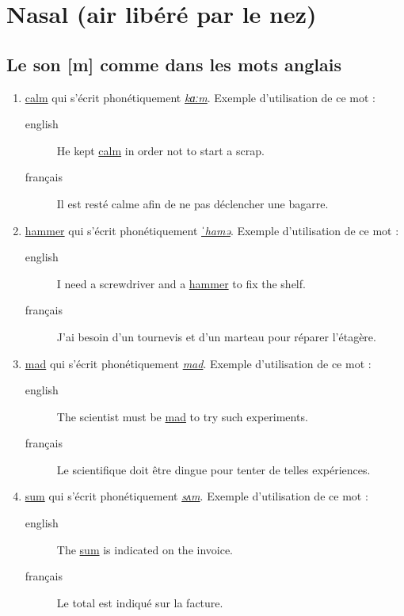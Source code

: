 \section{Nasal (air libéré par le nez)}
\label{sec:org63d4d3c}
\subsection{Le son [m] comme dans les mots anglais}
\label{sec:org6dbd0b1}
\begin{enumerate}
\item \href{http://www.wordreference.com/enfr/calm}{calm} qui s'écrit phonétiquement \href{https://en.oxforddictionaries.com/definition/calm}{\emph{kɑːm}}. Exemple d'utilisation de ce
mot :
\begin{description}
\item[{english}] \textenglish{He kept \href{https://youtu.be/1tXBl3Q5Ibc}{calm} in order not to start a scrap.}
\item[{français}] Il est resté calme afin de ne pas déclencher une
bagarre.
\end{description}
\item \href{http://www.wordreference.com/enfr/hammer}{hammer} qui s'écrit phonétiquement \href{https://en.oxforddictionaries.com/definition/hammer}{\emph{ˈhamə}}. Exemple d'utilisation de
ce mot :
\begin{description}
\item[{english}] \textenglish{I need a screwdriver and a \href{https://youtu.be/t5l2AUlD8Sk}{hammer} to fix the shelf.}
\item[{français}] J'ai besoin d'un tournevis et d'un marteau pour
réparer l'étagère.
\end{description}
\item \href{http://www.wordreference.com/enfr/mad}{mad} qui s'écrit phonétiquement \href{https://en.oxforddictionaries.com/definition/mad}{\emph{mad}}. Exemple d'utilisation de ce
mot :
\begin{description}
\item[{english}] \textenglish{The scientist must be \href{https://youtu.be/Oa-ae6\_okmg}{mad} to try such experiments.}
\item[{français}] Le scientifique doit être dingue pour tenter de telles expériences.
\end{description}
\item \href{http://www.wordreference.com/enfr/sum}{sum} qui s'écrit phonétiquement \href{https://en.oxforddictionaries.com/definition/sum}{\emph{sʌm}}. Exemple d'utilisation de ce
mot : 
\begin{description}
\item[{english}] \textenglish{The \href{https://youtu.be/ymUTWzsoiIg}{sum} is indicated on the invoice.}
\item[{français}] Le total est indiqué sur la facture.
\end{description}
\end{enumerate}
